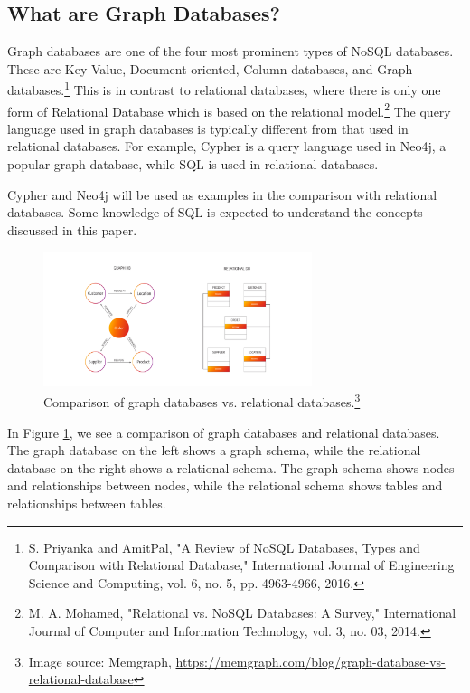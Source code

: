 \subsection{What are Graph Databases?}

Graph databases are one of the four most prominent types of NoSQL databases. These are Key-Value, Document oriented, Column databases, and Graph databases.\footnote{S. Priyanka and AmitPal, "A Review of NoSQL Databases, Types and Comparison with Relational Database," International Journal of Engineering Science and Computing, vol. 6, no. 5, pp. 4963-4966, 2016.} This is in contrast to relational databases, where there is only one form of Relational Database which is based on the relational model.\footnote{M. A. Mohamed, "Relational vs. NoSQL Databases: A Survey," International Journal of Computer and Information Technology, vol. 3, no. 03, 2014.} The query language used in graph databases is typically different from that used in relational databases. For example, Cypher is a query language used in Neo4j, a popular graph database, while SQL is used in relational databases. 

Cypher and Neo4j will be used as examples in the comparison with relational databases. Some knowledge of SQL is expected to understand the concepts discussed in this paper.

\begin{figure}[ht]
    \centering
    \includegraphics[width=0.7\textwidth]{assets/memgraph-graph-database-vs-relational-database.png}
    \caption{Comparison of graph databases vs. relational databases.\protect\footnote{Image source: Memgraph, \url{https://memgraph.com/blog/graph-database-vs-relational-database}}}
    \label{fig:graph_vs_table}
\end{figure}
In Figure \ref{fig:graph_vs_table}, we see a comparison of graph databases and relational databases. The graph database on the left shows a graph schema, while the relational database on the right shows a relational schema. The graph schema shows nodes and relationships between nodes, while the relational schema shows tables and relationships between tables. 

